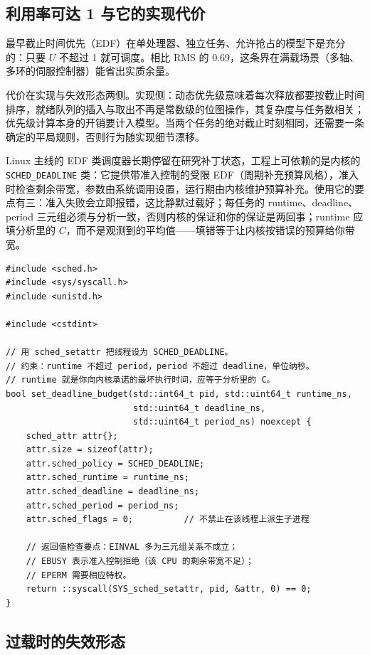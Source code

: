 \documentclass[12pt,a4paper,fontset=fandol]{ctexbook}
\newcommand{\Tp}[1]{\texttt{#1}}
\begin{document}
\subsection*{利用率可达 1 与它的实现代价}

最早截止时间优先（EDF）在单处理器、独立任务、允许抢占的模型下是充分的：只要 $U$ 不超过 1 就可调度。相比 RMS 的 0.69，这条界在满载场景（多轴、多环的伺服控制器）能省出实质余量。

代价在实现与失效形态两侧。实现侧：动态优先级意味着每次释放都要按截止时间排序，就绪队列的插入与取出不再是常数级的位图操作，其复杂度与任务数相关；优先级计算本身的开销要计入模型。当两个任务的绝对截止时刻相同，还需要一条确定的平局规则，否则行为随实现细节漂移。

Linux 主线的 EDF 类调度器长期停留在研究补丁状态，工程上可依赖的是内核的 \Tp{SCHED\_DEADLINE} 类：它提供带准入控制的受限 EDF（周期补充预算风格），准入时检查剩余带宽，参数由系统调用设置，运行期由内核维护预算补充。使用它的要点有三：准入失败会立即报错，这比静默过载好；每任务的 runtime、deadline、period 三元组必须与分析一致，否则内核的保证和你的保证是两回事；runtime 应填分析里的 $C$，而不是观测到的平均值——填错等于让内核按错误的预算给你带宽。

\begin{lstlisting}[style=cppstyle,caption={C++：SCHED\_DEADLINE 带宽参数设置骨架（Linux）},label={lst:ch10-sched-deadline}]
#include <sched.h>
#include <sys/syscall.h>
#include <unistd.h>

#include <cstdint>

// 用 sched_setattr 把线程设为 SCHED_DEADLINE。
// 约束：runtime 不超过 period，period 不超过 deadline，单位纳秒。
// runtime 就是你向内核承诺的最坏执行时间，应等于分析里的 C。
bool set_deadline_budget(std::int64_t pid, std::uint64_t runtime_ns,
                         std::uint64_t deadline_ns,
                         std::uint64_t period_ns) noexcept {
    sched_attr attr{};
    attr.size = sizeof(attr);
    attr.sched_policy = SCHED_DEADLINE;
    attr.sched_runtime = runtime_ns;
    attr.sched_deadline = deadline_ns;
    attr.sched_period = period_ns;
    attr.sched_flags = 0;          // 不禁止在该线程上派生子进程

    // 返回值检查要点：EINVAL 多为三元组关系不成立；
    // EBUSY 表示准入控制拒绝（该 CPU 的剩余带宽不足）；
    // EPERM 需要相应特权。
    return ::syscall(SYS_sched_setattr, pid, &attr, 0) == 0;
}
\end{lstlisting}

\subsection*{过载时的失效形态}
\end{document}
